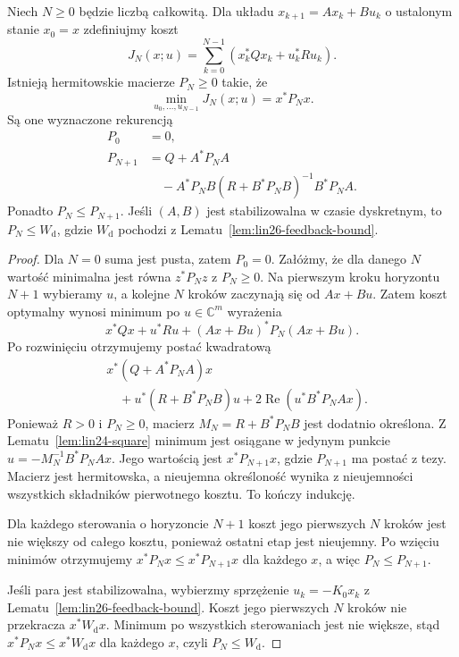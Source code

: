 \begin{lemat}
\label{lem:lin26-dare-recursion}
Niech \(N\ge0\) będzie
liczbą całkowitą.
Dla układu
\(x_{k+1}=Ax_k+Bu_k\)
o ustalonym stanie \(x_0=x\)
zdefiniujmy koszt
\[
 J_N(x;u)=\sum_{k=0}^{N-1}
   (x_k^*Qx_k+u_k^*Ru_k).
\]
Istnieją hermitowskie
macierze \(P_N\ge0\)
takie, że
\[
 \min_{u_0,\ldots,u_{N-1}}J_N(x;u)
 =x^*P_Nx.
\]
Są one wyznaczone rekurencją
\[
 \begin{aligned}
 P_0&=0,\\
 P_{N+1}&=Q+A^*P_NA\\
 &\quad-A^*P_NB(R+B^*P_NB)^{-1}B^*P_NA.
 \end{aligned}
\]
Ponadto \(P_N\le P_{N+1}\).
Jeśli \((A,B)\) jest
stabilizowalna w czasie
dyskretnym, to
\(P_N\le W_{\mathrm d}\),
gdzie \(W_{\mathrm d}\)
pochodzi z
Lematu~\ref{lem:lin26-feedback-bound}.
\end{lemat}
\begin{proof}
Dla \(N=0\) suma jest
pusta, zatem \(P_0=0\).
Załóżmy, że dla danego \(N\)
wartość minimalna jest
równa \(z^*P_Nz\)
z \(P_N\ge0\).
Na pierwszym kroku horyzontu
\(N+1\) wybieramy \(u\),
a kolejne \(N\) kroków
zaczynają się od \(Ax+Bu\).
Zatem koszt optymalny wynosi
minimum po \(u\in\mathbb C^m\)
wyrażenia
\[
 x^*Qx+u^*Ru+
         (Ax+Bu)^*P_N(Ax+Bu).
\]
Po rozwinięciu otrzymujemy
postać kwadratową
\[
 \begin{aligned}
 &x^*(Q+A^*P_NA)x\\
 &\quad+
 u^*(R+B^*P_NB)u
 +2\operatorname{Re}(u^*B^*P_NAx).
 \end{aligned}
\]
Ponieważ \(R>0\)
i \(P_N\ge0\),
macierz \(M_N=R+B^*P_NB\)
jest dodatnio określona.
Z
Lematu~\ref{lem:lin24-square}
minimum jest osiągane
w jedynym punkcie
\(u=-M_N^{-1}B^*P_NAx\).
Jego wartością jest
\(x^*P_{N+1}x\),
gdzie \(P_{N+1}\)
ma postać z tezy.
Macierz jest hermitowska,
a nieujemna określoność
wynika z nieujemności
wszystkich składników
pierwotnego kosztu.
To kończy indukcję.

Dla każdego sterowania
o horyzoncie \(N+1\)
koszt jego pierwszych \(N\)
kroków jest nie większy
od całego kosztu,
ponieważ ostatni etap
jest nieujemny.
Po wzięciu minimów
otrzymujemy
\(x^*P_Nx\le x^*P_{N+1}x\)
dla każdego \(x\), a więc
\(P_N\le P_{N+1}\).

Jeśli para jest stabilizowalna,
wybierzmy sprzężenie
\(u_k=-K_0x_k\)
z
Lematu~\ref{lem:lin26-feedback-bound}.
Koszt jego pierwszych \(N\)
kroków nie przekracza
\(x^*W_{\mathrm d}x\).
Minimum po wszystkich
sterowaniach jest nie większe,
stąd
\(x^*P_Nx\le x^*W_{\mathrm d}x\)
dla każdego \(x\),
czyli \(P_N\le W_{\mathrm d}\).
\end{proof}

